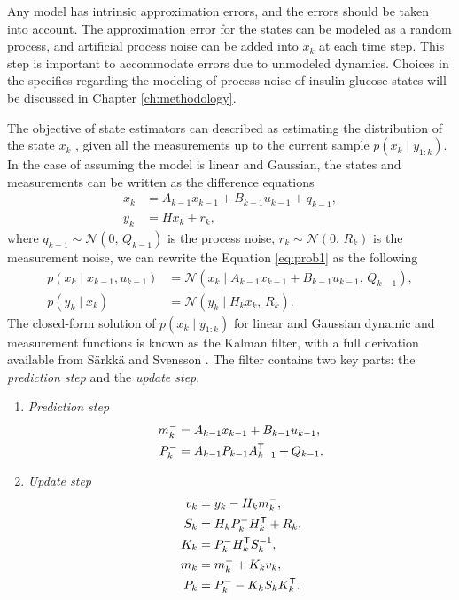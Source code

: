 \documentclass[nomenclature, english, bibtex]{kththesis}
\begin{document}
Any model has intrinsic approximation errors, and the errors should be taken into account. The approximation error for the states can be modeled as a random process, and artificial process noise can be added into $x_k$ at each time step. This step is important to accommodate errors due to unmodeled dynamics. Choices in the specifics regarding the modeling of process noise of insulin-glucose states will be discussed in Chapter \ref{ch:methodology}.

The objective of state estimators can described as estimating the distribution of the state $x_k$ , given all the measurements up to the current sample $p(x_{k} \mid y_{1:k})$. In the case of assuming the model is linear and Gaussian, the states and measurements can be written as the difference equations
\begin{equation}
\begin{aligned}
x_{k} &= A_{k-1}x_{k-1} + B_{k-1}u_{k-1} + q_{k-1}, \\
y_{k} &= Hx_{k} + r_{k},
\end{aligned}
\end{equation}
where $q_{k-1} \sim \mathcal{N}(0,\,Q_{k-1})$ is the process noise, $r_{k} \sim \mathcal{N}(0,\,R_k)$ is the measurement noise, we can rewrite the Equation \eqref{eq:prob1} as the following
\begin{equation}
\begin{aligned}
p(x_{k} \mid x_{k-1}, u_{k-1}) &= \mathcal{N}(x_{k} \mid A_{k-1}x_{k-1} + B_{k-1}u_{k-1},\,Q_{k-1}), \\
p(y_{k} \mid x_{k}) &= \mathcal{N}(y_{k} \mid H_{k}x_{k},\,R_{k}).
\end{aligned}
\end{equation}
The closed-form solution of $p(x_{k} \mid y_{1:k})$ for linear and Gaussian dynamic and measurement functions is known as the Kalman filter, with a full derivation available from Särkkä and Svensson \cite{sarkka_bayesian_nodate}. The filter contains two key parts: the \textit{prediction step} and the \textit{update step}.
\begin{enumerate}
\item \textit{Prediction step}
\begin{equation} \label{eq:Predict_kf}
\begin{aligned}
m_{k}^- &= A_{k-1}x_{k-1} + B_{k-1}u_{k-1}, \\
P_{k}^- &= A_{k-1}P_{k-1}A_{k-1}^{\sf T} + Q_{k-1}.
\end{aligned}
\end{equation}
\item \textit{Update step}
\begin{equation} \label{eq:Update_kf}
\begin{aligned}
v_{k} &= y_{k} - H_{k}m_{k}^- ,\\
S_{k} &= H_{k}P_{k}^-H_k^{\sf T} + R_k ,\\
K_k &= P_k^-H_k^{\sf T}S_k^{-1} ,\\
m_k &= m_k^- + K_kv_k ,\\
P_k &= P_k^- - K_kS_kK_k^{\sf T}.
\end{aligned}
\end{equation}
\end{enumerate}
\end{document}
